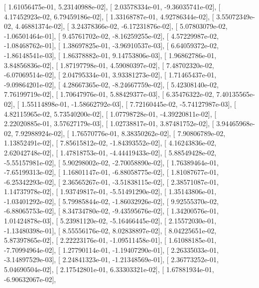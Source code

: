 \documentclass{article}
\begin{document}
       [  1.61056475e-01,   5.23140988e-02],
       [  2.03578334e-01,  -9.36035741e-02],
       [  4.17452923e-02,   6.79459186e-02],
       [  1.33168787e-01,   4.92786344e-02],
       [  3.55072349e-02,   4.46881374e-02],
       [  3.24378366e-02,  -6.17231876e-02],
       [  5.07803079e-02,  -1.06501464e-01],
       [  9.45761702e-02,  -8.16259255e-02],
       [  4.57229987e-02,  -1.08468762e-01],
       [  1.38697825e-01,  -3.96910537e-03],
       [  6.64059372e-02,  -1.86148541e-03],
       [  1.86378882e-01,   9.14753806e-03],
       [  1.96862786e-01,   3.84856836e-02],
       [  1.87197798e-01,   4.59080397e-02],
       [  7.48702320e-02,  -6.07069514e-02],
       [  2.04795334e-01,   3.93381273e-02],
       [  1.71465437e-01,  -9.09864201e-02],
       [  4.28667365e-02,  -8.24667759e-02],
       [  5.42308140e-02,   7.76199719e-02],
       [  1.70647976e-01,   5.88429377e-03],
       [  6.35476322e-02,   7.40135565e-02],
       [  1.55114898e-01,  -1.58662792e-03],
       [  7.72160445e-02,  -5.74127987e-03],
       [  4.82115965e-02,   5.73540200e-02],
       [  1.07798728e-01,  -4.39220811e-02],
       [  2.22020885e-01,   3.57627179e-03],
       [  1.02738817e-01,   3.87481752e-02],
       [  3.94465968e-02,   7.92988924e-02],
       [  1.76570776e-01,   8.38350262e-02],
       [  7.90806789e-02,   1.13852491e-02],
       [  7.85615812e-02,  -1.84393552e-02],
       [  4.16243836e-02,   2.62042748e-02],
       [  1.47818753e-01,  -4.44419433e-02],
       [  5.88549428e-02,  -5.55157981e-02],
       [  5.90298002e-02,  -2.70058890e-02],
       [  1.76389464e-01,  -7.65199313e-02],
       [  1.16801147e-01,  -6.88058775e-02],
       [  1.81087677e-01,  -6.25342293e-02],
       [  2.36565267e-01,  -3.51838115e-02],
       [  2.38571087e-01,   1.14737978e-02],
       [  1.93749817e-01,  -5.51491290e-02],
       [  1.35143806e-01,  -1.03401292e-02],
       [  5.79985844e-02,  -1.86032926e-02],
       [  9.92555370e-02,  -6.88065753e-02],
       [  8.34734780e-02,  -9.43595676e-02],
       [  1.34200576e-01,   1.01424878e-03],
       [  5.23981120e-02,  -5.16466445e-02],
       [  2.15572030e-01,  -1.13480398e-01],
       [  8.55556176e-02,   8.02838897e-02],
       [  8.04225651e-02,   5.87397865e-02],
       [  2.22223176e-01,  -1.09511458e-01],
       [  1.61088185e-01,  -7.70994964e-02],
       [  1.27790114e-01,  -1.19407290e-01],
       [  2.26335033e-01,  -3.14897529e-03],
       [  2.24841323e-01,  -1.21348569e-01],
       [  2.36773252e-01,   5.04690504e-02],
       [  2.17542801e-01,   6.33303321e-02],
       [  1.67881934e-01,  -6.90632067e-02],
\end{document}
